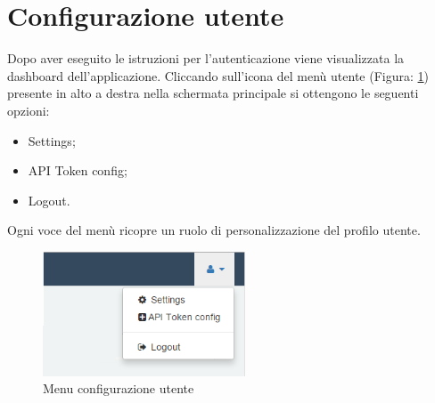 %

\section{Configurazione utente} %
\label{sec:configurazione_utente}
	Dopo aver eseguito le istruzioni per l'autenticazione\gloss{} viene visualizzata la dashboard\gloss{} dell’applicazione.\newline
	Cliccando sull'icona del menù utente (Figura: \ref{fig:menu_configurazione_utente}) presente in alto a destra nella schermata principale si ottengono le seguenti opzioni:
	\begin{itemize}
		\item Settings;
		\item API Token config;
		\item Logout.
	\end{itemize}
	Ogni voce del menù ricopre un ruolo di personalizzazione del profilo utente.
	\begin{figure}[H]
		\centering
		\centerline{\includegraphics[width=6cm]{images/menu_configurazione_utente.png}}
		\caption{Menu configurazione utente}
		\label{fig:menu_configurazione_utente}
	\end{figure}


	\pagebreak
